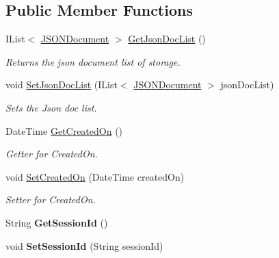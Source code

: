 \subsection*{Public Member Functions}
\begin{DoxyCompactItemize}
\item 
I\+List$<$ \hyperlink{classcom_1_1shephertz_1_1app42_1_1paas_1_1sdk_1_1windows_1_1user_1_1_user_1_1_j_s_o_n_document}{J\+S\+O\+N\+Document} $>$ \hyperlink{classcom_1_1shephertz_1_1app42_1_1paas_1_1sdk_1_1windows_1_1user_1_1_user_a8c94c8090728672a69131fa6261a7c12}{Get\+Json\+Doc\+List} ()
\begin{DoxyCompactList}\small\item\em Returns the json document list of storage. \end{DoxyCompactList}\item 
void \hyperlink{classcom_1_1shephertz_1_1app42_1_1paas_1_1sdk_1_1windows_1_1user_1_1_user_ab68f97fe1183f368a8db2c576e6112da}{Set\+Json\+Doc\+List} (I\+List$<$ \hyperlink{classcom_1_1shephertz_1_1app42_1_1paas_1_1sdk_1_1windows_1_1user_1_1_user_1_1_j_s_o_n_document}{J\+S\+O\+N\+Document} $>$ json\+Doc\+List)
\begin{DoxyCompactList}\small\item\em Sets the Json doc list. \end{DoxyCompactList}\item 
Date\+Time \hyperlink{classcom_1_1shephertz_1_1app42_1_1paas_1_1sdk_1_1windows_1_1user_1_1_user_a0b8de5b9352f394f6e2fc33b2a68b8cd}{Get\+Created\+On} ()
\begin{DoxyCompactList}\small\item\em Getter for Created\+On. \end{DoxyCompactList}\item 
void \hyperlink{classcom_1_1shephertz_1_1app42_1_1paas_1_1sdk_1_1windows_1_1user_1_1_user_aaab7146f84d26415f992968c9d38135c}{Set\+Created\+On} (Date\+Time created\+On)
\begin{DoxyCompactList}\small\item\em Setter for Created\+On. \end{DoxyCompactList}\item 
\hypertarget{classcom_1_1shephertz_1_1app42_1_1paas_1_1sdk_1_1windows_1_1user_1_1_user_a8c1a0ded7abd329cbb49fc87e652a481}{String {\bfseries Get\+Session\+Id} ()}\label{classcom_1_1shephertz_1_1app42_1_1paas_1_1sdk_1_1windows_1_1user_1_1_user_a8c1a0ded7abd329cbb49fc87e652a481}

\item 
\hypertarget{classcom_1_1shephertz_1_1app42_1_1paas_1_1sdk_1_1windows_1_1user_1_1_user_a3c9cd421453bac33ac86e208c89216a7}{void {\bfseries Set\+Session\+Id} (String session\+Id)}\label{classcom_1_1shephertz_1_1app42_1_1paas_1_1sdk_1_1windows_1_1user_1_1_user_a3c9cd421453bac33ac86e208c89216a7}


\end{DoxyCompactItemize}

